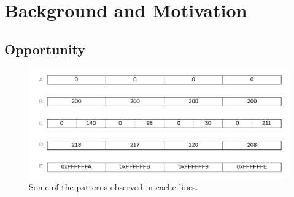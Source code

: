 
\chapter{Background and Motivation}
\label{ch:BackgroundMotiv}


\section{Opportunity}
\label{sec:Opportunity}
\begin{figure}
    \includegraphics[width=\textwidth]{Patterns.pdf}
    \caption[Patterns in cache lines]{Some of the patterns observed in cache lines.}
    \label{fig:Patterns}
\end{figure}
